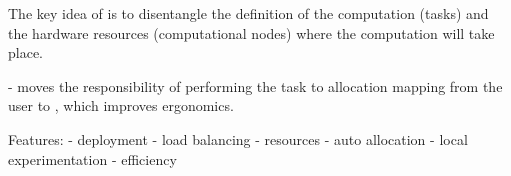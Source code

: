 The key idea of \hyperqueue{} is to disentangle the definition of the computation (tasks)
and the hardware resources (computational nodes) where the computation will take place.

- moves the responsibility of performing the task to allocation mapping from the user to
\hyperqueue{},
which improves ergonomics.


Features: - deployment - load balancing - resources - auto allocation - local experimentation -
efficiency

%
%
%
%

